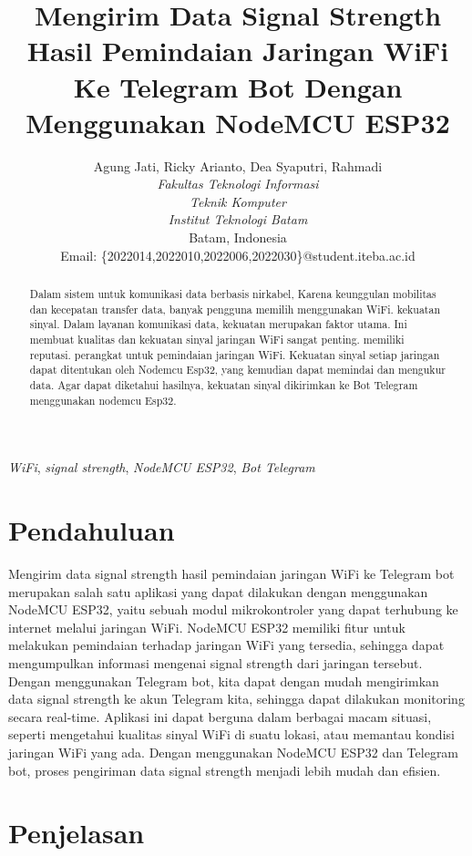 \documentclass[conference]{IEEEtran}
\title{Mengirim Data Signal Strength Hasil Pemindaian Jaringan WiFi Ke Telegram Bot Dengan Menggunakan NodeMCU ESP32}
\author{Agung Jati\IEEEauthorrefmark{1}, Ricky Arianto\IEEEauthorrefmark{2}, Dea Syaputri\IEEEauthorrefmark{3}, Rahmadi\IEEEauthorrefmark{4}\\
\textit{Fakultas Teknologi Informasi}\\
\textit{Teknik Komputer}\\
\textit{Institut Teknologi Batam}\\
Batam, Indonesia\\
Email: \{\IEEEauthorrefmark{1}2022014,\IEEEauthorrefmark{2}2022010,\IEEEauthorrefmark{3}2022006,\IEEEauthorrefmark{4}2022030\}@student.iteba.ac.id}
\begin{document}
\maketitle
\begin{abstract}
    Dalam sistem untuk komunikasi data berbasis nirkabel,
    Karena keunggulan mobilitas dan kecepatan transfer data, banyak pengguna memilih menggunakan WiFi. kekuatan sinyal.
    Dalam layanan komunikasi data, kekuatan merupakan faktor utama.
    Ini membuat kualitas dan kekuatan sinyal jaringan WiFi sangat penting.
    memiliki reputasi. perangkat untuk pemindaian jaringan WiFi.
    Kekuatan sinyal setiap jaringan dapat ditentukan oleh Nodemcu Esp32, yang kemudian dapat memindai dan mengukur data.
    Agar dapat diketahui hasilnya, kekuatan sinyal dikirimkan ke Bot Telegram menggunakan nodemcu Esp32.
\end{abstract}
\vspace{0.2cm}
\begin{IEEEkeywords}
    \emph{WiFi}, \emph{signal strength}, \emph{NodeMCU ESP32}, \emph{Bot Telegram}
\end{IEEEkeywords}
\section{Pendahuluan}
Mengirim data signal strength hasil pemindaian jaringan WiFi ke Telegram bot merupakan salah satu aplikasi yang dapat dilakukan dengan menggunakan NodeMCU ESP32, yaitu sebuah modul mikrokontroler yang dapat terhubung ke internet melalui jaringan WiFi. NodeMCU ESP32 memiliki fitur untuk melakukan pemindaian terhadap jaringan WiFi yang tersedia, sehingga dapat mengumpulkan informasi mengenai signal strength dari jaringan tersebut. Dengan menggunakan Telegram bot, kita dapat dengan mudah mengirimkan data signal strength ke akun Telegram kita, sehingga dapat dilakukan monitoring secara real-time. Aplikasi ini dapat berguna dalam berbagai macam situasi, seperti mengetahui kualitas sinyal WiFi di suatu lokasi, atau memantau kondisi jaringan WiFi yang ada. Dengan menggunakan NodeMCU ESP32 dan Telegram bot, proses pengiriman data signal strength menjadi lebih mudah dan efisien.

\section{Penjelasan}
\end{document}

